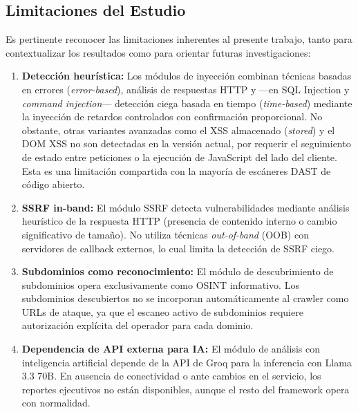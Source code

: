 \documentclass[12pt, a4paper]{article}
\begin{document}
\subsection{Limitaciones del Estudio}

Es pertinente reconocer las limitaciones inherentes al presente trabajo,
tanto para contextualizar los resultados como para orientar futuras
investigaciones:

\begin{enumerate}
    \item \textbf{Detección heurística:} Los módulos de inyección combinan
    técnicas basadas en errores (\textit{error-based}), análisis de respuestas
    HTTP y ---en SQL Injection y \textit{command injection}--- detección ciega
    basada en tiempo (\textit{time-based}) mediante la inyección de retardos
    controlados con confirmación proporcional. No obstante, otras variantes avanzadas como el
    XSS almacenado (\textit{stored}) y el DOM XSS no son detectadas en la
    versión actual, por requerir el seguimiento de estado entre peticiones o la
    ejecución de JavaScript del lado del cliente. Esta es una limitación
    compartida con la mayoría de escáneres DAST de código abierto.

    \item \textbf{SSRF in-band:} El módulo SSRF detecta vulnerabilidades
    mediante análisis heurístico de la respuesta HTTP (presencia de
    contenido interno o cambio significativo de tamaño). No utiliza
    técnicas \textit{out-of-band} (OOB) con servidores de callback
    externos, lo cual limita la detección de SSRF ciego.

    \item \textbf{Subdominios como reconocimiento:} El módulo de
    descubrimiento de subdominios opera exclusivamente como OSINT
    informativo. Los subdominios descubiertos no se incorporan
    automáticamente al crawler como URLs de ataque, ya que el escaneo
    activo de subdominios requiere autorización explícita del operador
    para cada dominio.

    \item \textbf{Dependencia de API externa para IA:} El módulo de
    análisis con inteligencia artificial depende de la API de Groq para
    la inferencia con Llama 3.3 70B. En ausencia de conectividad o ante
    cambios en el servicio, los reportes ejecutivos no están disponibles,
    aunque el resto del framework opera con normalidad.


\end{enumerate}
\end{document}
